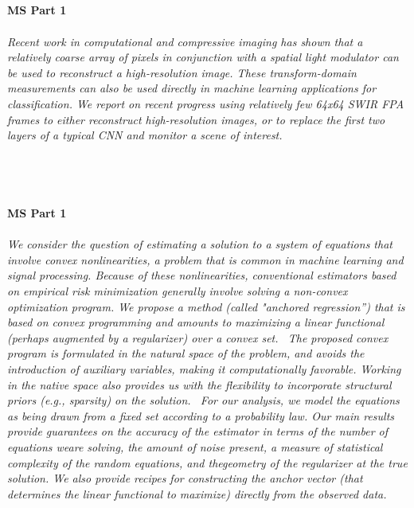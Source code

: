 \begin{multicols}{2}
\\ 
    \\
    \\\\
    \noindent\textbf{MS Part 1}\\
\\  
    \textit{Recent work in computational and compressive imaging has shown that a relatively coarse array of pixels in conjunction with a spatial light modulator can be used to reconstruct a high-resolution image. These transform-domain measurements can also be used directly in machine learning applications for classification. We report on recent progress using relatively few 64x64 SWIR FPA frames to either reconstruct high-resolution images, or to replace the first two layers of a typical CNN and monitor a scene of interest.}\\
\\ 
    \\
    \\\\
    \noindent\textbf{MS Part 1}\\
\\  
    \textit{We consider the question of estimating a solution to a system of equations that involve convex nonlinearities, a problem that is common in machine learning and signal processing. Because of these nonlinearities, conventional estimators based on empirical risk minimization generally involve solving a non-convex optimization program. We propose a method (called "anchored regression”) that is based on convex programming and amounts to maximizing a linear functional (perhaps augmented by a regularizer) over a convex set. 
\
The proposed convex program is formulated in the natural space of the problem, and avoids the introduction of auxiliary variables, making it computationally favorable. Working in the native space also provides us with the flexibility to incorporate structural priors (e.g., sparsity) on the solution.
\
For our analysis, we model the equations as being drawn from a fixed set according to a probability law.  Our main results provide guarantees on the accuracy of the estimator in terms of the number of equations weare solving, the amount of noise present, a measure of statistical complexity of the random equations, and thegeometry of the regularizer at the true solution. We also provide recipes for constructing the anchor vector (that determines the linear functional to maximize) directly from the observed data.
}
\end{multicols}
